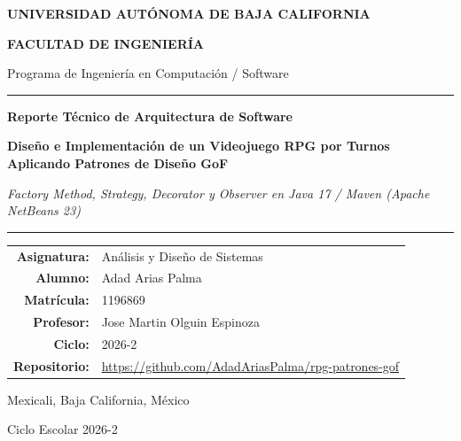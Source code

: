 \documentclass[12pt,letterpaper]{article}
\begin{document}
\begin{titlepage}
    \centering
    \vspace*{0.8cm}

    {\LARGE \bfseries \color{uabcGreen} UNIVERSIDAD AUTÓNOMA DE BAJA CALIFORNIA \par}
    \vspace{0.3cm}
    {\Large \bfseries FACULTAD DE INGENIERÍA \par}
    \vspace{0.2cm}
    {\large Programa de Ingeniería en Computación / Software \par}

    \vspace{1.2cm}
    \rule{\textwidth}{1.5pt}
    \vspace{0.6cm}

    {\Large \textbf{Reporte Técnico de Arquitectura de Software} \par}
    \vspace{0.4cm}
    {\huge \bfseries Diseño e Implementación de un Videojuego RPG por Turnos Aplicando Patrones de Diseño GoF \par}
    \vspace{0.4cm}
    {\normalsize \textit{Factory Method, Strategy, Decorator y Observer en Java 17 / Maven (Apache NetBeans 23)} \par}

    \vspace{0.6cm}
    \rule{\textwidth}{1.5pt}

    \vspace{1.8cm}
    \begin{tabular}{rl}
        \textbf{Asignatura:}  & Análisis y Diseño de Sistemas \\[0.3cm]
        \textbf{Alumno:}      & Adad Arias Palma \\[0.3cm]
        \textbf{Matrícula:}   & 1196869 \\[0.3cm]
        \textbf{Profesor:}    & Jose Martin Olguin Espinoza \\[0.3cm]
        \textbf{Ciclo:}       & 2026-2 \\[0.3cm]
        \textbf{Repositorio:} & \url{https://github.com/AdadAriasPalma/rpg-patrones-gof} \\
    \end{tabular}

    \vfill
    {\large Mexicali, Baja California, México \par}
    {\normalsize Ciclo Escolar 2026-2 \par}
\end{titlepage}
\end{document}
